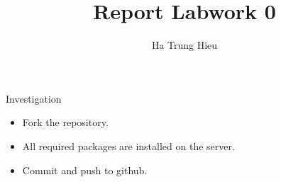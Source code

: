 \documentclass{article}
\title{Report Labwork 0}
\author{Ha Trung Hieu}
\begin{document}
\maketitle

Investigation

\begin{itemize}
	\item Fork the repository.
	\item All required packages are installed on the server.
	\item Commit and push to github.
\end{itemize}
\end{document}
